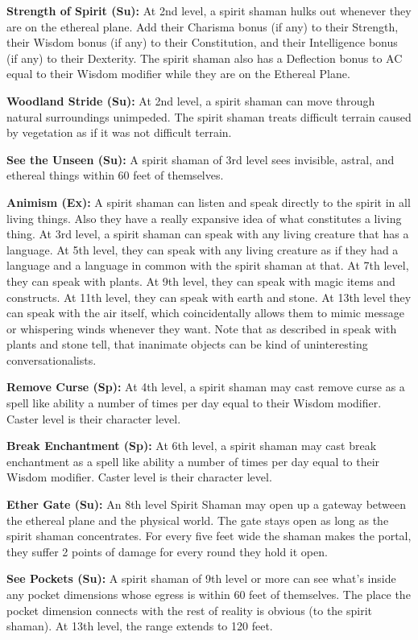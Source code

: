 \textbf{Strength of Spirit (Su):} At 2nd level, a spirit shaman hulks out whenever they are on the ethereal plane. Add their Charisma bonus (if any) to their Strength, their Wisdom bonus (if any) to their Constitution, and their Intelligence bonus (if any) to their Dexterity. The spirit shaman also has a Deflection bonus to AC equal to their Wisdom modifier while they are on the Ethereal Plane.

\textbf{Woodland Stride (Su):} At 2nd level, a spirit shaman can move through natural surroundings unimpeded. The spirit shaman treats difficult terrain caused by vegetation as if it was not difficult terrain.

\textbf{See the Unseen (Su):} A spirit shaman of 3rd level sees invisible, astral, and ethereal things within 60 feet of themselves.

\textbf{Animism (Ex):} A spirit shaman can listen and speak directly to the spirit in all living things. Also they have a really expansive idea of what constitutes a living thing. At 3rd level, a spirit shaman can speak with any living creature that has a language. At 5th level, they can speak with any living creature as if they had a language and a language in common with the spirit shaman at that. At 7th level, they can speak with plants. At 9th level, they can speak with magic items and constructs. At 11th level, they can speak with earth and stone. At 13th level they can speak with the air itself, which coincidentally allows them to mimic message or whispering winds whenever they want. Note that as described in speak with plants and stone tell, that inanimate objects can be kind of uninteresting conversationalists.

\textbf{Remove Curse (Sp):} At 4th level, a spirit shaman may cast remove curse as a spell like ability a number of times per day equal to their Wisdom modifier. Caster level is their character level.

\textbf{Break Enchantment (Sp):} At 6th level, a spirit shaman may cast break enchantment as a spell like ability a number of times per day equal to their Wisdom modifier. Caster level is their character level.

\textbf{Ether Gate (Su):} An 8th level Spirit Shaman may open up a gateway between the ethereal plane and the physical world. The gate stays open as long as the spirit shaman concentrates. For every five feet wide the shaman makes the portal, they suffer 2 points of damage for every round they hold it open.

\textbf{See Pockets (Su):} A spirit shaman of 9th level or more can see what's inside any pocket dimensions whose egress is within 60 feet of themselves. The place the pocket dimension connects with the rest of reality is obvious (to the spirit shaman). At 13th level, the range extends to 120 feet.

